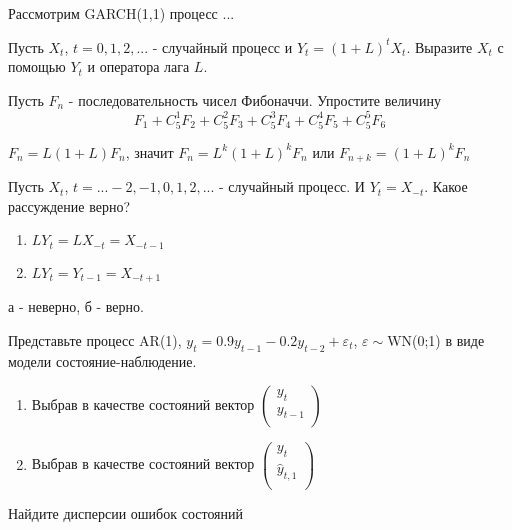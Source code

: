 \begin{problem}
Рассмотрим GARCH(1,1) процесс ...
\end{problem}
\begin{solution}
\end{solution}



\begin{problem}
Пусть $X_{t}$, $t=0,1,2,...$ - случайный процесс и $Y_{t}=(1+L)^{t}X_{t}$.
Выразите $X_{t}$ с помощью $Y_{t}$ и оператора лага $L$.


\begin{problem}Пусть $ F_{n} $ - последовательность чисел Фибоначчи. Упростите величину
\[ F_{1}+C^{1}_{5}F_{2}+C^{2}_{5}F_{3}+C^{3}_{5}F_{4}+C^{4}_{5}F_{5}+C^{5}_{5}F_{6} \]
\end{problem}
\begin{solution}
$ F_{n}=L(1+L)F_{n} $, значит $ F_{n}=L^{k}(1+L)^{k}F_{n} $ или $ F_{n+k}=(1+L)^{k}F_{n} $
\end{solution}




\begin{problem}
Пусть $X_{t}$, $t=...-2,-1,0,1,2,...$ - случайный процесс. И $Y_{t}=X_{-t}$. Какое рассуждение верно?

\begin{enumerate}
\item $LY_{t}=LX_{-t}=X_{-t-1}$
\item $LY_{t}=Y_{t-1}=X_{-t+1}$ 
\end{enumerate}
\end{problem}
\begin{solution}
а - неверно, б - верно.
\end{solution}



\begin{problem}Представьте процесс AR(1),
$y_{t}=0.9y_{t-1}-0.2y_{t-2}+\varepsilon_{t}$,
$\varepsilon\sim$WN(0;1) в виде модели состояние-наблюдение. 
\begin{enumerate}
\item Выбрав в качестве состояний вектор $\left(%
\begin{array}{c}
  y_{t} \\
  y_{t-1} \\
\end{array}%
\right)$ 
\item Выбрав в качестве состояний вектор $\left(%
\begin{array}{c}
  y_{t} \\
  \hat{y}_{t,1} \\
\end{array}%
\right)$ 
\end{enumerate}
Найдите дисперсии ошибок состояний 
\end{problem}
\begin{solution}
\end{solution}


\end{problem}
